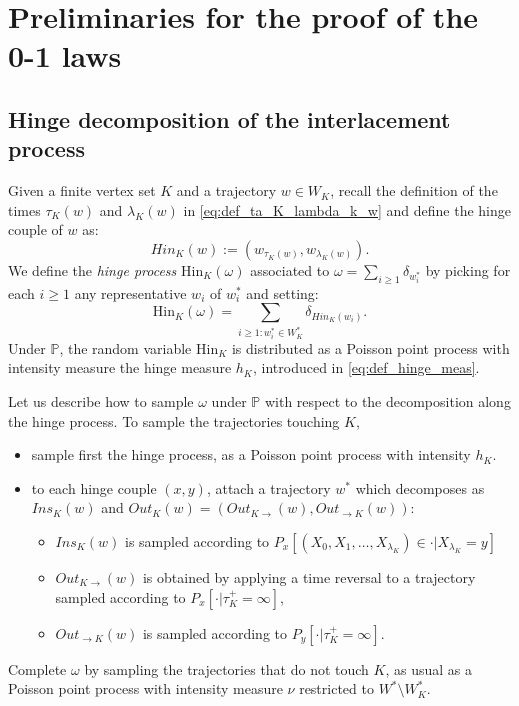 \documentclass[12pt,a4paper]{article}
\newcommand{\1}[1]{{\mathbf 1}{\{#1\}}}
\newcommand{\8}{{\infty}}
\newcommand{\p}{\mathbb{P}}
\newcommand{\Hin}{\mathrm{Hin}}
\begin{document}
 

\section{Preliminaries for the proof of the 0-1 laws}


\subsection{Hinge decomposition of the interlacement process}\label{sec:hinge_decomp}

Given a finite vertex set $K$ and a trajectory $w\in W_K$, recall the definition of the times $\tau_K(w)$ and $\lambda_K(w)$ in \eqref{eq:def_ta_K_lambda_k_w} and define the hinge couple of $w$ as:
\begin{equation}
  Hin_K(w):= (w_{\tau_K(w)}, w_{\lambda_K(w)}) .
\end{equation}
We define the \emph{hinge process} $\Hin_K(\omega)$ associated to $\omega=\sum_{i\ge 1} \delta_{w_i^*}$ by picking for each $i \ge 1$ any representative $w_i$ of $w_i^*$ and setting:
\begin{equation}
  \Hin_K(\omega)=\sum_{i\ge 1 : w_i^*\in W_K^*} \delta_{Hin_K(w_i)}.
\end{equation}
Under $\p$, the random variable $\Hin_K$ is distributed as a Poisson point process with intensity measure the hinge measure $h_K$, introduced in \eqref{eq:def_hinge_meas}. 

Let us describe how to sample $\omega$ under $\p$ with respect to the decomposition along the hinge process. 
To sample the trajectories touching $K$,
\begin{itemize}
\item sample first the hinge process, as a Poisson point process with intensity $h_K$.
\item to each hinge couple $(x, y)$, attach a trajectory $w^*$ which decomposes as $Ins_K(w)$ and $Out_K(w)=(Out_{K\rightarrow} (w), Out_{\rightarrow K}(w))$:
\begin{itemize}
\item $Ins_K(w)$ is sampled according to $P_x[ (X_0, X_1, \dots, X_{\lambda_K})\in \cdot | X_{\lambda_K}=y]$ 
\item $Out_{K\rightarrow} (w)$ is obtained by applying a time reversal to a trajectory sampled according to $P_x[ \cdot |  \tau^+_K=\infty]$,
\item $Out_{\rightarrow K}(w)$ is sampled according to $P_y[ \cdot | \tau^+_K=\infty]$.
\end{itemize} 
\end{itemize}
Complete $\omega$ by sampling the trajectories that do not touch $K$, as usual as a Poisson point process with intensity measure $\nu$ restricted to $W^*\setminus W_K^*$.
\end{document}
